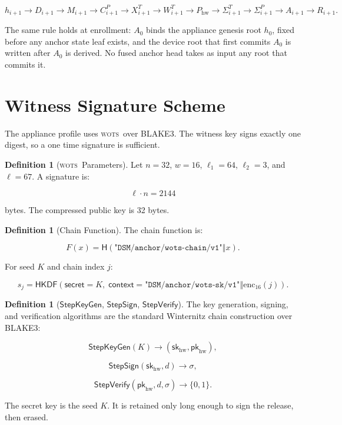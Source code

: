 \documentclass[11pt]{article}
\theoremstyle{definition}
\newtheorem{definition}[theorem]{Definition}
\theoremstyle{remark}
\newcommand{\concat}{\ensuremath{\mathbin{\Vert}}}
\newcommand{\Hf}{\ensuremath{\mathsf{H}}}
\newcommand{\HKDF}{\ensuremath{\mathsf{HKDF}}}
\newcommand{\StepKeyGen}{\ensuremath{\mathsf{StepKeyGen}}}
\newcommand{\StepSign}{\ensuremath{\mathsf{StepSign}}}
\newcommand{\StepVerify}{\ensuremath{\mathsf{StepVerify}}}
\newcommand{\ctx}[1]{\texttt{"#1"}}
\newcommand{\WOTS}{\textsc{wots}}
\newcommand{\Ahead}{\ensuremath{A}}
\newcommand{\pkhw}{\ensuremath{\mathsf{pk}_{\mathrm{hw}}}}
\newcommand{\skhw}{\ensuremath{\mathsf{sk}_{\mathrm{hw}}}}
\newcommand{\pkh}{\ensuremath{P_{\mathrm{hw}}}}
\begin{document}
\[
h_{i+1}
\rightarrow D_{i+1}
\rightarrow M_{i+1}
\rightarrow C^P_{i+1}
\rightarrow X^T_{i+1}
\rightarrow W^T_{i+1}
\rightarrow \pkh
\rightarrow \Sigma^T_{i+1}
\rightarrow \Sigma^P_{i+1}
\rightarrow \Ahead_{i+1}
\rightarrow R_{i+1}.
\]

The same rule holds at enrollment: \(\Ahead_0\) binds the appliance genesis root \(h_0\), fixed
before any anchor state leaf exists, and the device root that first commits \(\Ahead_0\) is
written after \(\Ahead_0\) is derived. No fused anchor head takes as input any root that commits
it.

\section{Witness Signature Scheme}

The appliance profile uses \WOTS\ over BLAKE3. The witness key signs exactly one digest, so a
one time signature is sufficient.

\begin{definition}[\WOTS\ Parameters]
Let \(n=32\), \(w=16\), \(\ell_1=64\), \(\ell_2=3\), and \(\ell=67\). A signature is:

\[
\ell\cdot n=2144
\]

bytes. The compressed public key is 32 bytes.
\end{definition}

\begin{definition}[Chain Function]
The chain function is:

\[
F(x)=\Hf(\ctx{DSM/anchor/wots-chain/v1}\concat x).
\]

For seed \(K\) and chain index \(j\):

\[
s_j=
\HKDF(
  \mathsf{secret}=K,\;
  \mathsf{context}=\ctx{DSM/anchor/wots-sk/v1}\concat\mathrm{enc}_{16}(j)
).
\]
\end{definition}

\begin{definition}[\StepKeyGen, \StepSign, \StepVerify]
The key generation, signing, and verification algorithms are the standard Winternitz chain
construction over BLAKE3:

\[
\StepKeyGen(K)\rightarrow(\skhw,\pkhw),
\]

\[
\StepSign(\skhw,d)\rightarrow\sigma,
\]

\[
\StepVerify(\pkhw,d,\sigma)\rightarrow\{0,1\}.
\]

The secret key is the seed \(K\). It is retained only long enough to sign the release, then erased.
\end{definition}
\end{document}
